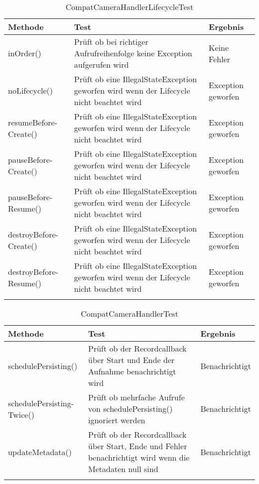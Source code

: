 \begin{longtable}{p{} | p{} | p{}}
\hline
  \textbf{Methode} & \textbf{Test} & \textbf{Ergebnis}\\
   \hline
   inOrder() & Prüft ob bei richtiger Aufrufreihenfolge keine Exception aufgerufen wird & Keine Fehler \\
   \hline
   noLifecycle() & Prüft ob eine IllegalStateException geworfen wird wenn der Lifecycle nicht beachtet wird & Exception geworfen \\
   \hline
   resumeBefore- \newline Create() & Prüft ob eine IllegalStateException geworfen wird wenn der Lifecycle nicht beachtet wird & Exception geworfen \\
   \hline
   pauseBefore- \newline Create() & Prüft ob eine IllegalStateException geworfen wird wenn der Lifecycle nicht beachtet wird & Exception geworfen \\
   \hline
   pauseBefore- \newline Resume() & Prüft ob eine IllegalStateException geworfen wird wenn der Lifecycle nicht beachtet wird & Exception geworfen \\
   \hline
   destroyBefore- \newline Create() & Prüft ob eine IllegalStateException geworfen wird wenn der Lifecycle nicht beachtet wird & Exception geworfen \\
   \hline
   destroyBefore- \newline Resume() & Prüft ob eine IllegalStateException geworfen wird wenn der Lifecycle nicht beachtet wird & Exception geworfen \\
   \hline
  \caption{CompatCameraHandlerLifecycleTest}
 \end{longtable}
 
\newpage
\begin{longtable}{p{} | p{} | p{}}
\hline
  \textbf{Methode} & \textbf{Test} & \textbf{Ergebnis}\\
   \hline
   schedulePersisting() & Prüft ob der Recordcallback über Start und Ende der Aufnahme benachrichtigt wird & Benachrichtigt \\
   \hline
   schedulePersisting- \newline Twice() & Prüft ob mehrfache Aufrufe von schedulePersisting() ignoriert werden & Benachrichtigt \\
   \hline
   updateMetadata() & Prüft ob der Recordcallback über Start, Ende und Fehler benachrichtigt wird wenn die Metadaten null sind & Benachrichtigt \\
   \hline
  \caption{CompatCameraHandlerTest}
\end{longtable}
 

